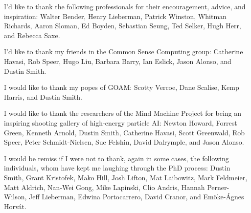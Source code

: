 \vspace{5mm}

\noindent I'd like to thank the following professionals for their encouragement, advice, and inspiration:
Walter Bender,
Henry Lieberman,
Patrick Winston,
Whitman Richards,
Aaron Sloman,
Ed Boyden,
Sebastian Seung,
Ted Selker,
Hugh Herr, and
Rebecca Saxe.

\vspace{5mm}

\noindent I'd like to thank my friends in the Common Sense Computing group:
Catherine Havasi,
Rob Speer,
Hugo Liu,
Barbara Barry,
Ian Eslick,
Jason Alonso, and
Dustin Smith.

\vspace{5mm}

\noindent I would like to thank my popes of GOAM:
Scotty Vercoe,
Dane Scalise,
Kemp Harris, and
Dustin Smith.

\vspace{5mm}

\noindent I would like to thank the researchers of the Mind Machine Project for being an inspiring shooting gallery of high-energy particle AI:
Newton Howard, Forrest Green, Kenneth Arnold, Dustin Smith, Catherine Havasi, Scott Greenwald, Rob Speer, Peter Schmidt-Nielsen, Sue Felshin, David Dalrymple, and Jason Alonso.

\vspace{5mm}

\noindent I would be remiss if I were not to thank, again in some cases, the following individuals,
whom have kept me laughing through the PhD process:
Dustin Smith, %
Grant Kristofek, %
Mako Hill, %
Josh Lifton, %
Mat Laibowitz, %
Mark Feldmeier, %
Matt Aldrich, %
Nan-Wei Gong, %
Mike Lapinski, %
Clio Andris, %
Hannah Perner-Wilson, %
Jeff Lieberman, %
Edwina Portocarrero, %
David Cranor, and %
Em\"{o}ke-\'{A}gnes Horv\'{a}t. %

\endgroup

